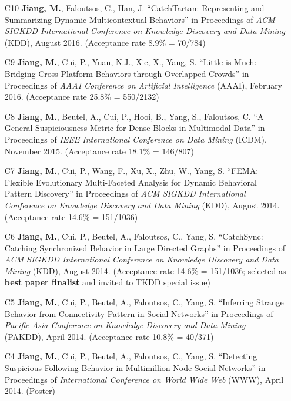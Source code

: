 \documentclass[10pt]{article}
\newenvironment{myindentpar}[1]%
{\begin{list}{}%
         {\setlength{\leftmargin}{#1}}%
         \item[]%
}
{\end{list}}
\newcounter{list}
\begin{document}
\begin{myindentpar}{0.00cm}
\begin{enumerate}[leftmargin=.5cm]
\item[C10] \textbf{Jiang, M.}, Faloutsos, C., Han, J. ``CatchTartan: Representing and Summarizing Dynamic Multicontextual Behaviors'' in Proceedings of \textit{ACM SIGKDD International Conference on Knowledge Discovery and Data Mining} (KDD), August 2016. (Acceptance rate 8.9\% = 70/784)

\item[C9] \textbf{Jiang, M.}, Cui, P., Yuan, N.J., Xie, X., Yang, S. ``Little is Much: Bridging Cross-Platform Behaviors through Overlapped Crowds'' in Proceedings of \textit{AAAI Conference on Artificial Intelligence} (AAAI), February 2016. (Acceptance rate 25.8\% = 550/2132)

\item[C8] \textbf{Jiang, M.}, Beutel, A., Cui, P., Hooi, B., Yang, S., Faloutsos, C. ``A General Suspiciousness Metric for Dense Blocks in Multimodal Data'' in Proceedings of \textit{IEEE International Conference on Data Mining} (ICDM), November 2015. (Acceptance rate 18.1\% = 146/807)

\item[C7] \textbf{Jiang, M.}, Cui, P., Wang, F., Xu, X., Zhu, W., Yang, S. ``FEMA: Flexible Evolutionary Multi-Faceted Analysis for Dynamic Behavioral Pattern Discovery'' in Proceedings of \textit{ACM SIGKDD International Conference on Knowledge Discovery and Data Mining} (KDD), August 2014. (Acceptance rate 14.6\% = 151/1036)

\item[C6] \textbf{Jiang, M.}, Cui, P., Beutel, A., Faloutsos, C., Yang, S. ``CatchSync: Catching Synchronized Behavior in Large Directed Graphs'' in Proceedings of \textit{ACM SIGKDD International Conference on Knowledge Discovery and Data Mining} (KDD), August 2014. (Acceptance rate 14.6\% = 151/1036; selected as \textbf{best paper finalist} and invited to TKDD special issue)
	
\item[C5] \textbf{Jiang, M.}, Cui, P., Beutel, A., Faloutsos, C., Yang, S. ``Inferring Strange Behavior from Connectivity Pattern in Social Networks'' in Proceedings of \textit{Pacific-Asia Conference on Knowledge Discovery and Data Mining} (PAKDD), April 2014. (Acceptance rate 10.8\% = 40/371)

\item[C4] \textbf{Jiang, M.}, Cui, P., Beutel, A., Faloutsos, C., Yang, S. ``Detecting Suspicious Following Behavior in Multimillion-Node Social Networks'' in Proceedings of \textit{International Conference on World Wide Web} (WWW), April 2014. (Poster)


\end{enumerate}
\end{myindentpar}
\end{document}
